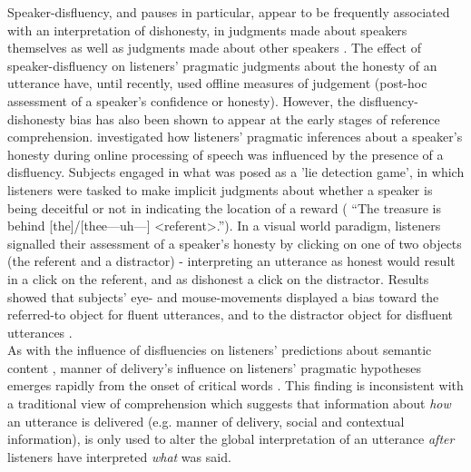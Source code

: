 \documentclass[man]{apa6}
\begin{document}
Speaker-disfluency, and pauses in particular, appear to be frequently associated with an interpretation of dishonesty, in judgments made about speakers themselves as well as judgments made about other speakers \citep{Zuckerman1981}. 
The effect of speaker-disfluency on listeners' pragmatic judgments about the honesty of an utterance have, until recently, used offline measures of judgement (post-hoc assessment of a speaker's confidence or honesty). 
However, the disfluency-dishonesty bias has also been shown to appear at the early stages of reference comprehension. 
\citet{Loy2016} investigated how listeners' pragmatic inferences about a speaker's honesty during online processing of speech was influenced by the presence of a disfluency. 
Subjects engaged in what was posed as a 'lie detection game', in which listeners were tasked to make implicit judgments about whether a speaker is being deceitful or not in indicating the location of a reward ( ``The treasure is behind [the]/[thee---uh---] \textless referent\textgreater .''). 
In a visual world paradigm, listeners signalled their assessment of a speaker's honesty by clicking on one of two objects (the referent and a distractor) - interpreting an utterance as honest would result in a click on the referent, and as dishonest a click on the distractor. 
Results showed that subjects' eye- and mouse-movements displayed a bias toward the referred-to object for fluent utterances, and to the distractor object for disfluent utterances \citep{Loy2016}.\\


As with the influence of disfluencies on listeners' predictions about semantic content \citep{Arnold2004, Arnold2007, Barr2001}, manner of delivery's influence on listeners' pragmatic hypotheses emerges rapidly from the onset of critical words \citep{Loy2016}. 
This finding is inconsistent with a traditional view \citep{Blank1988} of comprehension which suggests that information about \textit{how} an utterance is delivered (e.g. manner of delivery, social and contextual information), is only used to alter the global interpretation of an utterance \textit{after} listeners have interpreted \textit{what} was said. 
\end{document}
